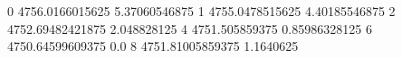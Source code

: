 0 4756.0166015625 5.37060546875
1 4755.0478515625 4.40185546875
2 4752.69482421875 2.048828125
4 4751.505859375 0.85986328125
6 4750.64599609375 0.0
8 4751.81005859375 1.1640625
